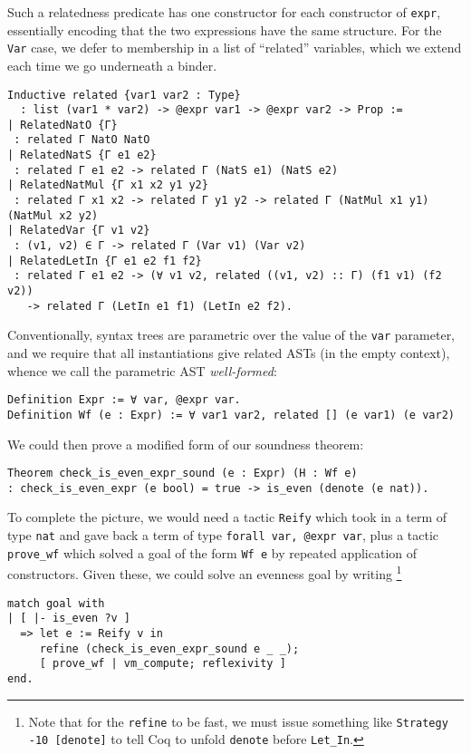 Such a relatedness predicate has one constructor for each constructor of \texttt{expr}, essentially encoding that the two expressions have the same structure.
For the \texttt{Var} case, we defer to membership in a list of ``related'' variables, which we extend each time we go underneath a binder.
\begin{verbatim}
Inductive related {var1 var2 : Type}
  : list (var1 * var2) -> @expr var1 -> @expr var2 -> Prop :=
| RelatedNatO {Γ}
 : related Γ NatO NatO
| RelatedNatS {Γ e1 e2}
 : related Γ e1 e2 -> related Γ (NatS e1) (NatS e2)
| RelatedNatMul {Γ x1 x2 y1 y2}
 : related Γ x1 x2 -> related Γ y1 y2 -> related Γ (NatMul x1 y1) (NatMul x2 y2)
| RelatedVar {Γ v1 v2}
 : (v1, v2) ∈ Γ -> related Γ (Var v1) (Var v2)
| RelatedLetIn {Γ e1 e2 f1 f2}
 : related Γ e1 e2 -> (∀ v1 v2, related ((v1, v2) :: Γ) (f1 v1) (f2 v2))
   -> related Γ (LetIn e1 f1) (LetIn e2 f2).
\end{verbatim}

Conventionally, syntax trees are parametric over the value of the \texttt{var} parameter, and we require that all instantiations give related ASTs (in the empty context), whence we call the parametric AST \emph{well-formed}:
\begin{verbatim}
Definition Expr := ∀ var, @expr var.
Definition Wf (e : Expr) := ∀ var1 var2, related [] (e var1) (e var2)
\end{verbatim}
\label{sec:PHOAS:Wf-def}

We could then prove a modified form of our soundness theorem:
\begin{verbatim}
Theorem check_is_even_expr_sound (e : Expr) (H : Wf e)
: check_is_even_expr (e bool) = true -> is_even (denote (e nat)).
\end{verbatim}

To complete the picture, we would need a tactic \texttt{Reify} which took in a term of type \texttt{nat} and gave back a term of type \texttt{forall var, @expr var}, plus a tactic \texttt{prove_wf} which solved a goal of the form \texttt{Wf e} by repeated application of constructors.
Given these, we could solve an evenness goal by writing%
\footnote{%
  Note that for the \texttt{refine} to be fast, we must issue something like \texttt{Strategy -10 [denote]} to tell Coq to unfold \texttt{denote} before \texttt{Let_In}.
  }
\begin{verbatim}
match goal with
| [ |- is_even ?v ]
  => let e := Reify v in
     refine (check_is_even_expr_sound e _ _);
     [ prove_wf | vm_compute; reflexivity ]
end.
\end{verbatim}

